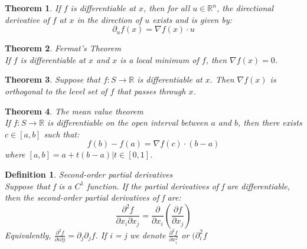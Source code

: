 \documentclass[11pt]{book} %
\newtheorem{theorem}{Theorem}[section]
\newtheorem{definition}{Definition}[section]
\begin{document}
\begin{theorem}
If $f$ is differentiable at $x$, then for all $u \in \mathbb{R}^n$, the directional derivative of $f$ at $x$ in the direction of $u$ exists and is given by:
\begin{equation}
    \partial_u f(x) = \nabla f(x) \cdot u
\end{equation}
\end{theorem}

\bigbreak

\begin{theorem}{Fermat's Theorem} \\
If $f$ is differentiable at $x$ and $x$ is a local minimum of $f$, then $\nabla f(x) = 0$.
\end{theorem}

\bigbreak

\begin{theorem}
Suppose that $f: S \rightarrow \mathbb{R}$ is differentiable at $x$. Then $\nabla f(x)$ is orthogonal to the level set of $f$ that passes through $x$.    
\end{theorem}

\bigbreak

\begin{theorem}{The mean value theorem} \\
If $f: S \rightarrow \mathbb{R}$ is differentiable on the open interval between $a$ and $b$, then there exists $c \in [a,b]$ such that:
\begin{equation}
    f(b) - f(a) = \nabla f(c) \cdot (b-a)
\end{equation}
where $[a,b] = {a + t(b-a) | t \in [0,1]}$.
\end{theorem}

\bigbreak

\begin{definition}{Second-order partial derivatives} \\
Suppose that f is a $C^1$ function. If the partial derivatives of f are differentiable, then the second-order partial derivatives of f are:
\begin{equation}
    \frac{\partial^2 f}{\partial x_i \partial x_j} = \frac{\partial}{\partial x_i} \left( \frac{\partial f}{\partial x_j} \right) 
\end{equation}
Equivalently, $\frac{\partial^2 f}{\partial i \partial j} = \partial_j \partial_j f$.
If i = j we denote $\frac{\partial^2 f}{\partial x_i^2}$ or $(\partial_i^2 f$
\end{definition}
\end{document}
